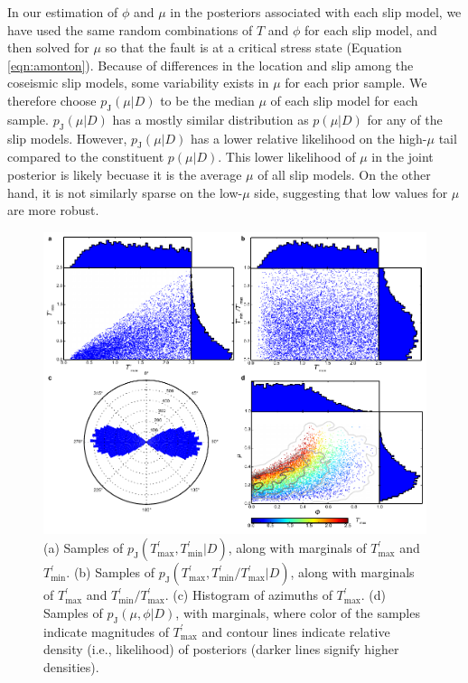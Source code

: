 \documentclass[twocolumn,jgrga]{AGUTeX}
\begin{document}
\begin{article}
In our estimation of $\phi$ and $\mu$ in the posteriors associated with
each slip model, we have used the same random combinations of $T$ and
$\phi$ for each slip model, and then solved for $\mu$ so that the fault
is at a critical stress state (Equation \ref{eqn:amonton}). Because of
differences in the location and slip among the coseismic slip models,
some variability exists in $\mu$ for each prior sample. We therefore
choose $p_{\mathrm{J}}(\mu | D)$ to be the median $\mu$ of each slip
model for each sample. $p_{\mathrm{J}}(\mu | D)$ has a mostly similar
distribution as $p(\mu | D)$ for any of the slip models. However,
$p_{\mathrm{J}}(\mu | D)$ has a lower relative likelihood on the
high-$\mu$ tail compared to the constituent $p(\mu | D)$. This lower
likelihood of $\mu$ in the joint posterior is likely becuase it is the
average $\mu$ of all slip models. On the other hand, it is not similarly
sparse on the low-$\mu$ side, suggesting that low values for $\mu$ are
more robust.

\begin{figure}[t]
\centering
\includegraphics[width=40pc]{../figures/joint_pdfs.pdf}
\caption{(a) Samples of
$p_{\mathrm{J}}(T^\prime_{\mathrm{max}},T^\prime_{\mathrm{min}} | D)$,
along with marginals of $T^\prime_{\mathrm{max}}$ and
$T^\prime_{\mathrm{min}}$. (b) Samples of
$p_{\mathrm{J}}(T^\prime_{\mathrm{\max}}, T^\prime_{\mathrm{\min}}/T^\prime_{\mathrm{max}} | D)$,
along with marginals of $T^\prime_{\mathrm{max}}$ and
$T^\prime_{\mathrm{min}} / T^\prime_{\mathrm{max}}$. (c) Histogram of
azimuths of $T^\prime_{\mathrm{\max}}$. (d) Samples of
$p_{\mathrm{J}}(\mu, \phi | D)$, with marginals, where color of the samples
indicate magnitudes of $T^\prime_{\mathrm{\max}}$ and contour
lines indicate relative density (i.e., likelihood) of posteriors (darker
lines signify higher densities).}
\label{fig:joint_posteriors}
\end{figure}


\end{article}
\end{document}
